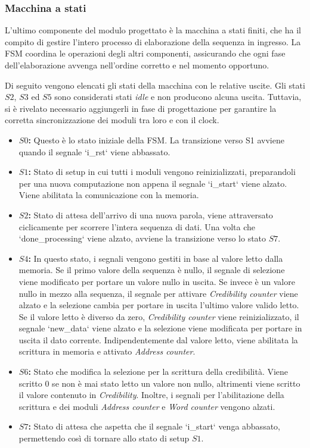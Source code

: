 \subsubsection{Macchina a stati}
  \par L'ultimo componente del modulo progettato è la macchina a stati finiti, che ha il compito di gestire l'intero processo di elaborazione della sequenza in ingresso.
    La FSM coordina le operazioni degli altri componenti, assicurando che ogni fase dell'elaborazione avvenga nell'ordine corretto e nel momento opportuno.
  \par Di seguito vengono elencati gli stati della macchina con le relative uscite.
    Gli stati $S2$, $S3$ ed $S5$ sono considerati stati \textit{idle} e non producono alcuna uscita.
    Tuttavia, si è rivelato necessario aggiungerli in fase di progettazione per garantire la corretta sincronizzazione dei moduli tra loro e con il clock.
  \begin{itemize}
    \item \textbf{$S0$:} Questo è lo stato iniziale della FSM.
      La transizione verso S1 avviene quando il segnale `i\_rst` viene abbassato.
    \item \textbf{$S1$:} Stato di setup in cui tutti i moduli vengono reinizializzati, preparandoli per una nuova computazione non appena il segnale `i\_start` viene alzato.
      Viene abilitata la comunicazione con la memoria.
    \item \textbf{$S2$:} Stato di attesa dell'arrivo di una nuova parola, viene attraversato ciclicamente per scorrere l'intera sequenza di dati.
      Una volta che `done\_processing` viene alzato, avviene la transizione verso lo stato $S7$.
    \item \textbf{$S4$:} In questo stato, i segnali vengono gestiti in base al valore letto dalla memoria.
      Se il primo valore della sequenza è nullo, il segnale di selezione viene modificato per portare un valore nullo in uscita.
      Se invece è un valore nullo in mezzo alla sequenza, il segnale per attivare \textit{Credibility counter} viene alzato e la selezione cambia per portare in uscita l'ultimo valore valido letto.
      Se il valore letto è diverso da zero, \textit{Credibility counter} viene reinizializzato, il segnale `new\_data` viene alzato e la selezione viene modificata per portare in uscita il dato corrente.
      Indipendentemente dal valore letto, viene abilitata la scrittura in memoria e attivato \textit{Address counter}.
    \item \textbf{$S6$:} Stato che modifica la selezione per la scrittura della credibilità.
      Viene scritto 0 se non è mai stato letto un valore non nullo, altrimenti viene scritto il valore contenuto in \textit{Credibility}.
      Inoltre, i segnali per l'abilitazione della scrittura e dei moduli \textit{Address counter} e \textit{Word counter} vengono alzati.
    \item \textbf{$S7$:} Stato di attesa che aspetta che il segnale `i\_start` venga abbassato, permettendo così di tornare allo stato di setup $S1$.
  \end{itemize}

